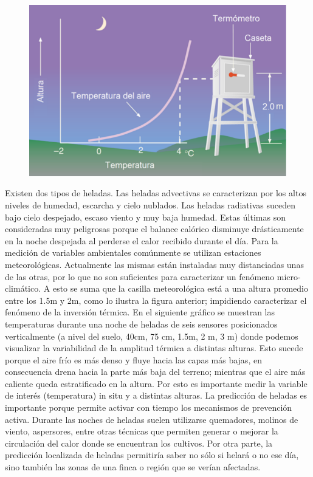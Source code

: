 \documentclass[final,a4paper]{llncs}
\begin{document}
\begin{figure}[h]
\includegraphics[width=0.70\columnwidth]{casilla.png}
\end{figure}\label{fig:casilla}
Existen dos tipos de heladas. Las heladas advectivas se caracterizan por los
 altos niveles de humedad, escarcha y cielo nublados. Las heladas radiativas suceden 
 bajo cielo despejado, escaso viento y muy baja humedad. Estas últimas son consideradas muy peligrosas
 porque el balance calórico disminuye drásticamente en la noche despejada al perderse el 
 calor recibido durante el día. Para la medición de variables ambientales comúnmente se utilizan estaciones meteorológicas. Actualmente las mismas están instaladas muy distanciadas unas de las otras, por lo que no son suficientes para 
caracterizar un fenómeno micro-climático. A esto se suma que la casilla meteorológica está
a una altura promedio entre los 1.5m y 2m, como lo ilustra la figura\cite{saavedraTesis} anterior; impidiendo
 caracterizar el fenómeno de la inversión térmica. En el siguiente gráfico \cite{pid-fca-uncu-dataset}
 se muestran las temperaturas durante una noche de heladas de seis sensores 
posicionados verticalmente (a nivel del suelo, 40cm, 75 cm, 1.5m, 2 m, 3 m) donde 
podemos visualizar la variabilidad de la amplitud térmica a distintas alturas. 
Esto sucede porque el aire frío es más denso y fluye hacia las capas más bajas, 
en consecuencia drena hacia la parte más baja del terreno; mientras que 
el aire más caliente queda estratificado en la 
altura. Por esto es importante medir la variable de interés (temperatura) in situ y a distintas
alturas.
La predicción de heladas es importante porque permite activar con tiempo los mecanismos de 
prevención activa. Durante las noches de heladas suelen utilizarse quemadores, molinos de viento,
aspersores, entre otras técnicas que permiten generar o mejorar la circulación del calor donde 
se encuentran los cultivos. Por otra parte, la predicción localizada de heladas permitiría 
saber no sólo si helará o no ese día,
sino también las zonas de una finca o región que se verían afectadas.
\end{document}
